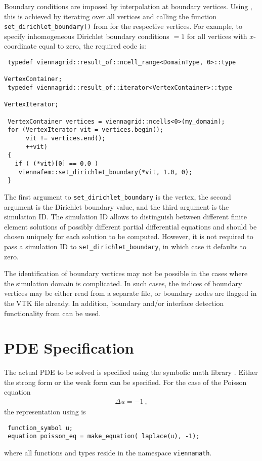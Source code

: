 Boundary conditions are imposed by interpolation at boundary vertices. Using {\ViennaGrid}, this is achieved by iterating over all vertices and
calling the function \lstinline|set_dirichlet_boundary()| from {\ViennaFEM} for the respective vertices. For example, to specify inhomogeneous Dirichlet
boundary conditions $ = 1$ for all vertices with $x$-coordinate equal to zero, the required code is:
\begin{lstlisting}
 typedef viennagrid::result_of::ncell_range<DomainType, 0>::type  
                                                           VertexContainer;
 typedef viennagrid::result_of::iterator<VertexContainer>::type 
                                                           VertexIterator;

 VertexContainer vertices = viennagrid::ncells<0>(my_domain);
 for (VertexIterator vit = vertices.begin();
      vit != vertices.end();
      ++vit)
 {
   if ( (*vit)[0] == 0.0 )
    viennafem::set_dirichlet_boundary(*vit, 1.0, 0);
 }
\end{lstlisting}
The first argument to \lstinline|set_dirichlet_boundary| is the vertex, the second argument is the Dirichlet boundary value, and the third argument is
the simulation ID. The simulation ID allows to distinguish between different finite element solutions of possibly different partial differential equations and
should be chosen uniquely for each solution to be computed. However, it is not required to pass a simulation ID to \lstinline|set_dirichlet_boundary|, in which
case it defaults to zero.

The identification of boundary vertices may not be possible in the cases where the simulation domain is complicated. In such cases, the indices of boundary
vertices may be either read from a separate file, or boundary nodes are flagged in the VTK file already. In addition, boundary and/or interface detection
functionality from {\ViennaGrid} can be used.


\section{PDE Specification}
The actual PDE to be solved is specified using the symbolic math library {\ViennaMath}. 
Either the strong form or the weak form can be specified. For the case of the Poisson equation
\begin{align}
 \Delta u = -1 \ ,
\end{align}
the representation using {\ViennaMath} is
\begin{lstlisting}
 function_symbol u;
 equation poisson_eq = make_equation( laplace(u), -1);
\end{lstlisting}
where all functions and types reside in the namespace \lstinline|viennamath|.

